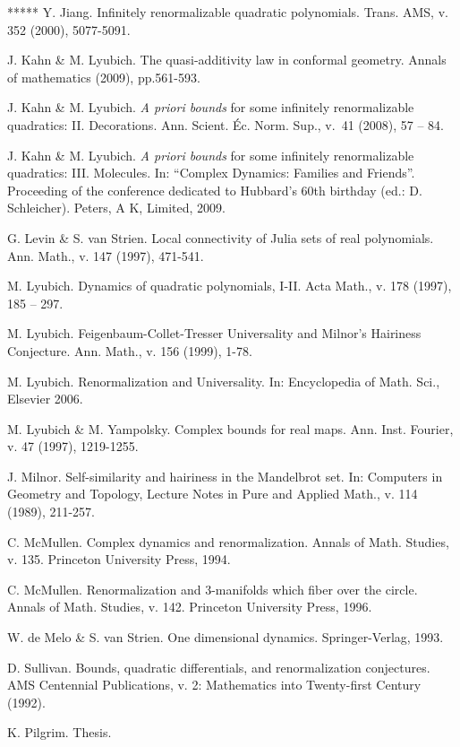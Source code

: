 \begin{thebibliography}{*****}
 Y. Jiang. Infinitely renormalizable quadratic polynomials. 
    Trans. AMS, v. 352 (2000), 5077-5091. 






 J. Kahn \& M. Lyubich.
The quasi-additivity law in conformal geometry. Annals of mathematics (2009), pp.561-593.

 J. Kahn \& M. Lyubich. {\it A priori bounds} for some infinitely
renormalizable quadratics: II.  Decorations.
Ann. Scient. \'Ec. Norm. Sup., v.~41 (2008), 57 -- 84.

 J. Kahn \& M. Lyubich. {\it A priori bounds} for some infinitely
renormalizable quadratics: III.  Molecules.  In: ``Complex Dynamics: Families and Friends''.
    Proceeding of the conference dedicated to Hubbard's 60th birthday (ed.:  D. Schleicher). 
    Peters, A K, Limited, 2009. 

 G. Levin \& S. van Strien.
    Local connectivity of Julia sets  of real polynomials.
   Ann. Math., v. 147 (1997), 471-541.  


 M. Lyubich. Dynamics of quadratic polynomials, I-II. 
   Acta Math., v. 178 (1997), 185 -- 297.

 M. Lyubich. 
  Feigenbaum-Collet-Tresser Universality and Milnor's Hairiness Conjecture.
  Ann. Math., v. 156 (1999), 1-78. 

 M. Lyubich. Renormalization and Universality. 
In: Encyclopedia of Math. Sci., Elsevier 2006. 

 M. Lyubich \& M. Yampolsky. 
    Complex bounds for real maps. Ann. Inst. Fourier, v. 47 (1997), 1219-1255. 







 J. Milnor. Self-similarity and hairiness in the Mandelbrot set.
 In: Computers in Geometry and Topology, 
 Lecture Notes in Pure and Applied Math., v. 114 (1989), 211-257. 

 C. McMullen. Complex dynamics and renormalization.
   Annals of Math. Studies, v. 135.
   Princeton University Press, 1994. 

 C. McMullen.
   Renormalization and 3-manifolds 
which fiber over the circle.  Annals of Math. Studies, v. 142.
 Princeton University Press, 1996. 


 W. de Melo \& S. van Strien. 
   One dimensional dynamics. Springer-Verlag, 1993.

 D. Sullivan.
     Bounds, quadratic differentials,
and renormalization conjectures.  AMS Centennial Publications,
v. 2: Mathematics into Twenty-first Century (1992).  


 K. Pilgrim. Thesis. 

\end{thebibliography}




